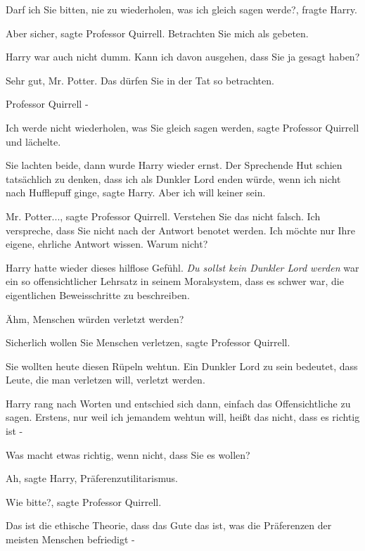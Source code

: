 \glqq Darf ich Sie bitten, nie zu wiederholen, was ich gleich sagen
werde?\grqq{}, fragte Harry.

\glqq Aber sicher\grqq{}, sagte Professor Quirrell. \glqq Betrachten Sie mich
als gebeten.\grqq{}

Harry war auch nicht dumm. \glqq Kann ich davon ausgehen, dass Sie ja gesagt
haben?\grqq{}

\glqq Sehr gut, Mr. Potter. Das dürfen Sie in der Tat so betrachten.\grqq{}

\glqq Professor Quirrell -\grqq{}

\glqq Ich werde nicht wiederholen, was Sie gleich sagen werden\grqq{}, sagte
Professor Quirrell und lächelte.

Sie lachten beide, dann wurde Harry wieder ernst. \glqq Der Sprechende Hut
schien tatsächlich zu denken, dass ich als Dunkler Lord enden würde, wenn ich
nicht nach Hufflepuff ginge\grqq{}, sagte Harry. \glqq Aber ich will keiner
sein.\grqq{}

\glqq Mr. Potter...\grqq{}, sagte Professor Quirrell. \glqq Verstehen Sie das
nicht falsch. Ich verspreche, dass Sie nicht nach der Antwort benotet werden.
Ich möchte nur Ihre eigene, ehrliche Antwort wissen. Warum nicht?\grqq{}

Harry hatte wieder dieses hilflose Gefühl. \emph{Du sollst kein Dunkler Lord
werden} war ein so offensichtlicher Lehrsatz in seinem Moralsystem, dass es
schwer war, die eigentlichen Beweisschritte zu beschreiben.

\glqq Ähm, Menschen würden verletzt werden?\grqq{}

\glqq Sicherlich wollen Sie Menschen verletzen\grqq{}, sagte Professor
Quirrell.

\glqq Sie wollten heute diesen Rüpeln wehtun. Ein Dunkler Lord zu sein bedeutet,
dass Leute, die man verletzen will, verletzt werden.\grqq{}

Harry rang nach Worten und entschied sich dann, einfach das Offensichtliche zu
sagen. \glqq Erstens, nur weil ich jemandem wehtun will, heißt das nicht, dass
es richtig ist -\grqq{}

\glqq Was macht etwas richtig, wenn nicht, dass Sie es wollen?\grqq{}

\glqq Ah\grqq{}, sagte Harry, \glqq Präferenzutilitarismus.\grqq{}

\glqq Wie bitte?\grqq{}, sagte Professor Quirrell.

\glqq Das ist die ethische Theorie, dass das Gute das ist, was die Präferenzen
der meisten Menschen befriedigt -\grqq{}

